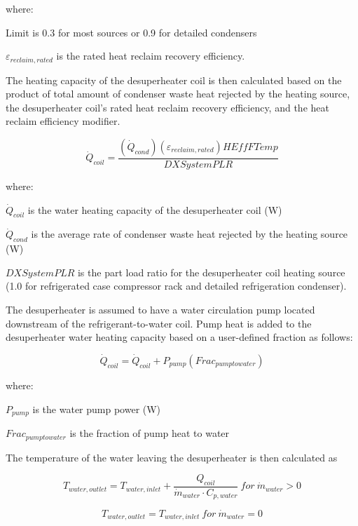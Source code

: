 where:

Limit is 0.3 for most sources or 0.9 for detailed condensers

\({\varepsilon_{reclaim,rated}}\) is the rated heat reclaim recovery efficiency.

The heating capacity of the desuperheater coil is then calculated based on the product of total amount of condenser waste heat rejected by the heating source, the desuperheater coil's rated heat reclaim recovery efficiency, and the heat reclaim efficiency modifier.

\begin{equation}
{\dot Q_{coil}} = {\frac{{\left( {{{\dot Q}_{cond}}} \right)\left( {{\varepsilon_{reclaim,rated}}} \right)HEffFTemp}}{DXSystemPLR}}
\end{equation}

where:

\({\dot Q_{coil}}\) is the water heating capacity of the desuperheater coil (W)

\({\dot Q_{cond}}\) is the average rate of condenser waste heat rejected by the heating source (W)

\(DXSystemPLR\) is the part load ratio for the desuperheater coil heating source (1.0 for refrigerated case compressor rack and detailed refrigeration condenser).

The desuperheater is assumed to have a water circulation pump located downstream of the refrigerant-to-water coil. Pump heat is added to the desuperheater water heating capacity based on a user-defined fraction as follows:

\begin{equation}
{\dot Q_{coil}} = {\dot Q_{coil}} + {P_{pump}}\left( {Fra{c_{pumptowater}}} \right)
\end{equation}

where:

\({P_{pump}}\) is the water pump power (W)

\(Fra{c_{pumptowater}}\) is the fraction of pump heat to water

The temperature of the water leaving the desuperheater is then calculated as

\begin{equation}
{T_{water,outlet}} = {T_{water,inlet}} + \frac{{{Q_{coil}}}}{{{{\dot m}_{water}}\cdot {C_{p,water}}}} ~for~ {\dot m_{water}} > 0
\end{equation}

\begin{equation}
{T_{water,outlet}} = {T_{water,inlet}} ~for~ {\dot m_{water}} = 0
\end{equation}

